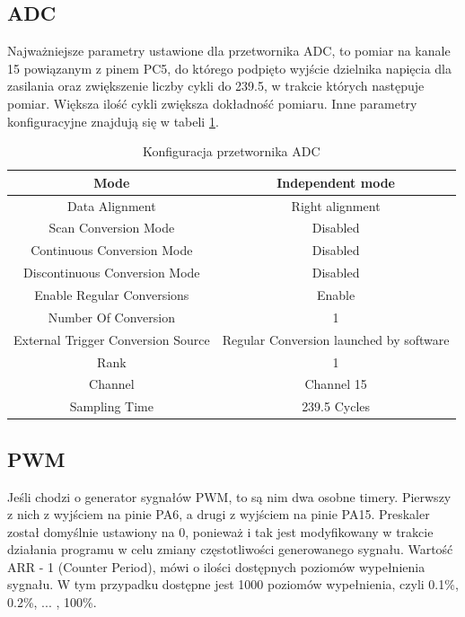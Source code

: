 \subsection{ADC}

Najważniejsze parametry ustawione dla przetwornika ADC, to pomiar na kanale 15 powiązanym z pinem PC5, do którego podpięto wyjście dzielnika napięcia dla zasilania oraz zwiększenie liczby cykli do 239.5, w trakcie których następuje pomiar. Większa ilość cykli zwiększa dokładność pomiaru. Inne parametry konfiguracyjne znajdują się w tabeli \ref{Konfiguracja przetwornika ADC}.

\begin{table}[h!]
    \centering
    \caption{Konfiguracja przetwornika ADC}
    \begin{tabular}{|c|c|}
        \hline
        Mode & Independent mode \\
        \hline
        Data Alignment & Right alignment \\
        \hline
        Scan Conversion Mode & Disabled \\
        \hline
        Continuous Conversion Mode & Disabled \\
        \hline
        Discontinuous Conversion Mode & Disabled \\
        \hline
        Enable Regular Conversions & Enable \\
        \hline
        Number Of Conversion &  1 \\
        \hline
        External Trigger Conversion Source & Regular Conversion launched by software \\
        \hline
        Rank & 1 \\
        \hline
        Channel & Channel 15 \\
        \hline
        Sampling Time & 239.5 Cycles \\
        \hline
    \end{tabular}
    \label{Konfiguracja przetwornika ADC}
\end{table}

\subsection{PWM}

Jeśli chodzi o generator sygnałów PWM, to są nim dwa osobne timery. Pierwszy z nich z wyjściem na pinie PA6, a drugi z wyjściem na pinie PA15. Preskaler został domyślnie ustawiony na 0, ponieważ i tak jest modyfikowany w trakcie działania programu w celu zmiany częstotliwości generowanego sygnału. Wartość ARR - 1 (Counter Period), mówi o ilości dostępnych poziomów wypełnienia sygnału. W tym przypadku dostępne jest 1000 poziomów wypełnienia, czyli 0.1\%, 0.2\%, ... , 100\%. 

